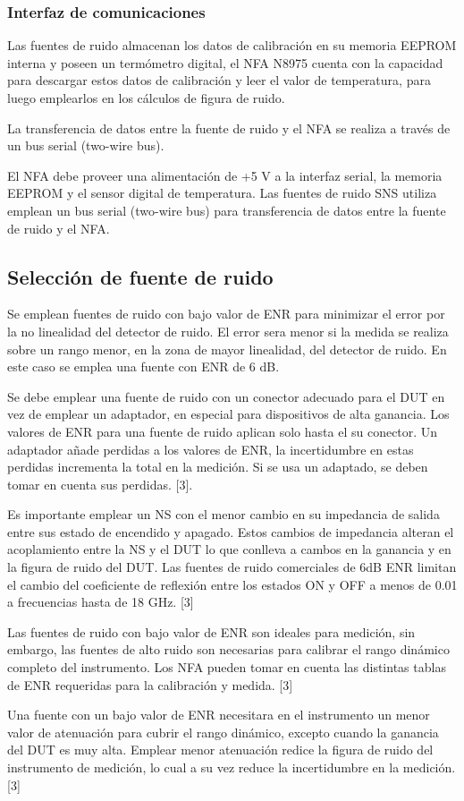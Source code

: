 	\subsubsection{Interfaz de comunicaciones}
	Las fuentes de ruido almacenan los datos de calibración en su memoria EEPROM interna y poseen un termómetro digital, el NFA N8975 cuenta con la capacidad para descargar estos datos de calibración y leer el valor de temperatura, para luego emplearlos en los cálculos de figura de ruido.
	
	La transferencia de datos entre la fuente de ruido y el NFA se realiza a través de un bus serial (two-wire bus). 
	
	El NFA debe proveer una alimentación de +5 V a la interfaz serial, la memoria EEPROM y el sensor digital de temperatura. Las fuentes de ruido SNS utiliza emplean un bus serial (two-wire bus) para transferencia de datos entre la fuente de ruido y el NFA. 
	
	\subsection{Selección de fuente de ruido}
	Se emplean fuentes de ruido con bajo valor de ENR para minimizar el error por la no linealidad del detector de ruido. El error sera menor si la medida se realiza sobre un rango menor, en la zona de mayor linealidad, del detector de ruido. En este caso se emplea una fuente con ENR de 6 dB.
	
	Se debe emplear una fuente de ruido con un conector adecuado para el DUT en vez de emplear un adaptador, en especial para dispositivos de alta ganancia. Los valores de ENR para una fuente de ruido aplican solo hasta el su conector. Un adaptador añade perdidas a los valores de ENR, la incertidumbre en estas perdidas incrementa la  total en la medición. Si se usa un adaptado, se deben tomar en cuenta sus perdidas. [3].
	
	Es importante emplear un NS con el menor cambio en su impedancia de salida entre sus estado de encendido y apagado. Estos cambios de impedancia alteran el acoplamiento entre la NS y el DUT lo que conlleva a cambos en la ganancia y en la figura de ruido del DUT. Las fuentes de ruido comerciales de 6dB ENR limitan el cambio del coeficiente de reflexión entre los estados ON y OFF a menos de 0.01 a frecuencias hasta de 18 GHz. [3]
	
	Las fuentes de ruido con bajo valor de ENR son ideales para medición, sin embargo, las fuentes de alto ruido son necesarias para calibrar el rango dinámico completo del instrumento. Los NFA pueden tomar en cuenta las distintas tablas de ENR requeridas para la calibración y medida. [3]
	
	Una fuente con un bajo valor de ENR necesitara en el instrumento un menor valor de atenuación para cubrir el rango dinámico, excepto cuando la ganancia del DUT es muy alta. Emplear menor atenuación redice la figura de ruido del instrumento de medición, lo cual a su vez reduce la incertidumbre en la medición. [3]	
	